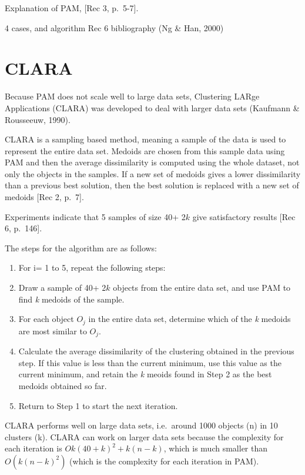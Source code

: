 \documentclass[12pt,twoside]{amherstthesis}
\begin{document}
  Explanation of PAM, {[}Rec 3, p.~5-7{]}.
  
  4 cases, and algorithm Rec 6 bibliography (Ng \& Han, 2000)
  
  \section{CLARA}\label{clara}
  
  Because PAM does not scale well to large data sets, Clustering LARge
  Applications (CLARA) was developed to deal with larger data sets
  (Kaufmann \& Rousseeuw, 1990).
  
  CLARA is a sampling based method, meaning a sample of the data is used
  to represent the entire data set. Medoids are chosen from this sample
  data using PAM and then the average dissimilarity is computed using the
  whole dataset, not only the objects in the samples. If a new set of
  medoids gives a lower dissimilarity than a previous best solution, then
  the best solution is replaced with a new set of medoids {[}Rec 2,
  p.~7{]}.
  
  Experiments indicate that 5 samples of size 40+ 2\(k\) give satisfactory
  results {[}Rec 6, p.~146{]}.
  
  The steps for the algorithm are as follows:
  
  \begin{enumerate}
  \def\labelenumi{\arabic{enumi}.}
  \item
    For i= 1 to 5, repeat the following steps:
  \item
    Draw a sample of 40+ 2\(k\) objects from the entire data set, and use
    PAM to find \emph{k} medoids of the sample.
  \item
    For each object \(O_j\) in the entire data set, determine which of the
    \emph{k} medoids are most similar to \(O_j\).
  \item
    Calculate the average dissimilarity of the clustering obtained in the
    previous step. If this value is less than the current minimum, use
    this value as the current minimum, and retain the \emph{k} meoids
    found in Step 2 as the best medoids obtained so far.
  \item
    Return to Step 1 to start the next iteration.
  \end{enumerate}
  
  CLARA performs well on large data sets, i.e.~around 1000 objects (n) in
  10 clusters (k). CLARA can work on larger data sets because the
  complexity for each iteration is \(O{k(40 + k)^2 + k(n-k)}\), which is
  much smaller than \(O(k(n-k)^2)\) (which is the complexity for each
  iteration in PAM).
  
\end{document}
